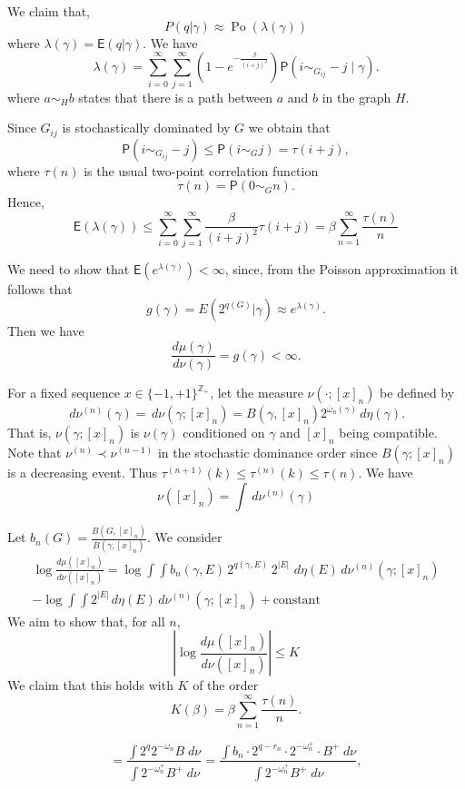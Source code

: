 \documentclass[11pt, a4paper, oneside]{scrartcl}
\theoremstyle{definition}
\theoremstyle{remark}
\renewcommand{\d}{\,d}
\providecommand{\ZZ}{\mathbb{Z}}
\providecommand{\ol}{\overline}
\def\ii#1{^{(#1)}}
\providecommand{\E}{\mathsf{E}}
\renewcommand{\P}{\mathsf{P}}
\providecommand{\w}{\omega}
\begin{document}
We claim that,
$$
P(q|\gamma)\approx \operatorname{Po}(\lambda(\gamma))
$$
where $\lambda(\gamma) = \mathsf E(q|\gamma)$. We have 
\[
\lambda(\gamma) = \sum_{i=0}^{\infty} \sum_{j=1}^{\infty} (1-e^{-\frac{\beta}{(i+j)^2}}) 
\mathsf P(i\sim_{G_{ij}} -j\mid \gamma).
\]
where $a\sim_H b$ states that there is a path between $a$ and $b$ in the graph $H$. 

Since $G_{ij}$ is stochastically dominated by $G$ we obtain that 
\[
\P(i \sim_{G_{ij}} -j) \le \P(i \sim_G j) = \tau(i+j),
\]
where $\tau(n)$ is the usual two-point correlation function 
\[
\tau(n) = \mathsf P(0\sim_G n).  
\]
Hence, 
\[
\mathsf E(\lambda(\gamma)) \le
\sum_{i=0}^\infty 
\sum_{j=1}^\infty \frac\beta{(i+j)^2} \tau(i+j) = 
\beta \sum_{n=1}^\infty \frac {\tau(n)}n
\]

We need to show that $\E(e^{\lambda(\gamma)})<\infty$, since, from
the Poisson approximation it follows that 
$$
g(\gamma)=E(2^{q(G)}|\gamma) \approx e^{\lambda(\gamma)}.
$$
Then we have 
$$\frac{d\mu(\gamma)}{d\nu(\gamma)}=g(\gamma) < \infty. $$


For a fixed sequence $x\in\{-1,+1\}^{\ZZ_+}$, 
let the measure $\nu(\cdot;[x]_n)$ be defined by
\[
\d\nu\ii n(\gamma) = 
\d\nu(\gamma; [x]_n) =
B(\gamma,[x]_n) 2^{\ol\w_n(\gamma)} \d\eta(\gamma).
\]
That is, $\nu(\gamma; [x]_n)$ is $\nu(\gamma)$ conditioned on $\gamma$ and
$[x]_n$ being compatible. Note that $\nu\ii n \prec \nu\ii {n-1}$ in the
stochastic dominance order since $B(\gamma; [x]_n)$ is a decreasing event. Thus
$\tau\ii {n+1} (k) \le \tau\ii n (k) \le \tau(n)$. We have
\[
\nu([x]_n) = \int \d\nu\ii n(\gamma)
\]

Let $b_n(G)=\frac{B(G,[x]_n)}{B(\gamma,[x]_n)}$. 
We consider 
\begin{gather*}
\log \frac{d\mu([x]_n)}{d\nu([x]_n)}
=
\log {\int \int b_n(\gamma,E)\, 2^{q(\gamma,E)} \, 2^{|E|}\, \d\eta(E)\, d\nu\ii n (\gamma; [x]_n)} \\
-  \log {\int \int 2^{|E|} \d\eta(E)\, d\nu\ii n(\gamma; [x]_n) } + \text{constant}
\end{gather*}
We aim to show that, for all $n$,
\begin{equation}
  |\log \frac{d\mu([x]_n)}{d\nu([x]_n)}| \le K 
\end{equation}
We claim that this holds with $K$ of the order
\[
K(\beta) = \beta \sum_{n=1}^\infty \frac{\tau(n)}{n}.
\]

\[
=\frac{\int2^q 2^{-\omega_n} B\; d\nu}{\int 2^{-\omega_n^+} B^+\; d\nu }
=\frac{\int b_n \cdot 2^{q-r_n}\cdot 2^{-\omega_n^+}\cdot B^+\; d\nu}{\int 2^{-\omega_n^+} B^+\; d\nu},
\]
\end{document}
